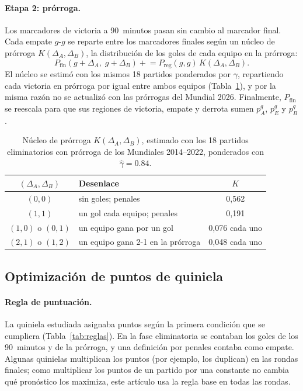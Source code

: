 \documentclass[12pt]{article}
\theoremstyle{plain}
\theoremstyle{remark}
\begin{document}
\paragraph{Etapa 2: prórroga.}
Los marcadores de victoria a 90~minutos pasan sin cambio al marcador
final.
Cada empate $g$-$g$ se reparte entre los marcadores finales según un
núcleo de prórroga $K(\Delta_A, \Delta_B)$, la distribución de los
goles de cada equipo en la prórroga:
\begin{equation}
  P_{\mathrm{fin}}(g + \Delta_A,\; g + \Delta_B)
  \mathrel{+}= P_{\mathrm{reg}}(g, g) \, K(\Delta_A, \Delta_B).
\end{equation}
El núcleo se estimó con los mismos 18 partidos ponderados por
$\gamma$, repartiendo cada victoria en prórroga por igual entre ambos
equipos (Tabla~\ref{tab:nucleo}), y por la misma razón no se
actualizó con las prórrogas del Mundial 2026.
Finalmente, $P_{\mathrm{fin}}$ se reescala para que sus regiones de
victoria, empate y derrota sumen $p^q_A$, $p^q_E$ y $p^q_B$.

\begin{table}[tb]
\centering
\caption{Núcleo de prórroga $K(\Delta_A, \Delta_B)$, estimado con los 18
partidos eliminatorios con prórroga de los Mundiales 2014--2022,
ponderados con $\hat\gamma = 0.84$.}
\label{tab:nucleo}
\begin{tabular}{clc}
  \toprule
  $(\Delta_A, \Delta_B)$ & Desenlace & $K$ \\
  \midrule
  $(0,0)$ & sin goles; penales & 0,562 \\
  $(1,1)$ & un gol cada equipo; penales & 0,191 \\
  $(1,0)$ o $(0,1)$ & un equipo gana por un gol & 0,076 cada uno \\
  $(2,1)$ o $(1,2)$ & un equipo gana 2-1 en la prórroga & 0,048 cada uno \\
  \bottomrule
\end{tabular}
\end{table}

\subsection{Optimización de puntos de quiniela}
\label{sec:optimizacion}

\paragraph{Regla de puntuación.}
La quiniela estudiada asignaba puntos según la primera condición que
se cumpliera (Tabla~\ref{tab:reglas}).
En la fase eliminatoria se contaban los goles de los 90~minutos y de
la prórroga, y una definición por penales contaba como empate.
Algunas quinielas multiplican los puntos (por ejemplo, los duplican)
en las rondas finales; como multiplicar los puntos de un partido por
una constante no cambia qué pronóstico los maximiza, este artículo
usa la regla base en todas las rondas.
\end{document}
